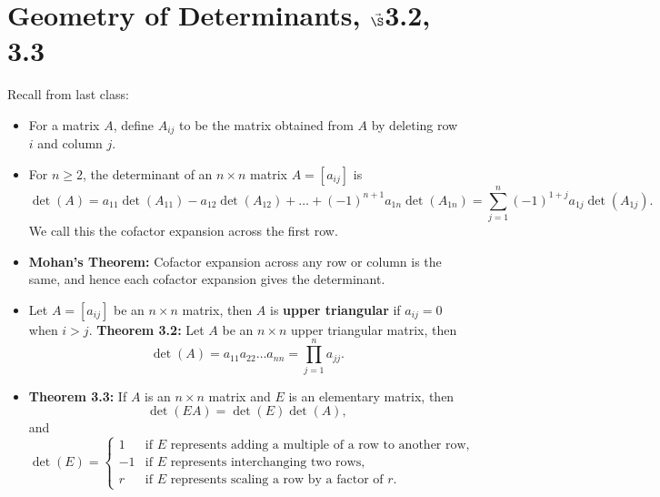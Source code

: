 


%

%

\section{{Geometry of Determinants, $\vec\S$3.2, 3.3}}%
% 

%
\thispagestyle{fancy}

Recall from last class:

\begin{itemize}
\item For a matrix $A$, define  $A_{ij}$ to be the matrix obtained from $A$ by deleting row $i$ and column $j$.
\item For $n\geq 2$, the determinant of an $n\times n$ matrix $A=[a_{ij}]$ is
\begin{equation*}
\operatorname{det}(A)= a_{11} \operatorname{det}(A_{11}) - a_{12} \operatorname{det}(A_{12})+\dots + (-1)^{n+1} a_{1n} \operatorname{det}(A_{1n})=\sum_{j=1}^{n}(-1)^{1+j}a_{1j} \operatorname{det}(A_{1j}).
\end{equation*} We call this the cofactor expansion across the first row.
\item {\bf Mohan's Theorem:} Cofactor expansion across any row or column is the same, and hence each cofactor expansion gives the determinant.
\item Let $A=[a_{ij}]$ be an $n\times n$ matrix, then $A$ is {\bf upper triangular} if $a_{ij}=0$ when $i>j$.
{\bf Theorem 3.2:} Let $A$ be an $n\times n$ upper triangular matrix, then $$\operatorname{det}(A)= a_{11}a_{22}\dots a_{nn} = \prod_{j=1}^n a_{jj}.$$
\item {\bf Theorem 3.3:} If $A$ is an $n\times n$ matrix and $E$ is an elementary matrix, then $$\operatorname{det}(EA)=\operatorname{det}(E) \operatorname{det}(A),$$ and 
$$\operatorname{det}(E)=\begin{cases}
1 & \text{if $E$ represents adding a multiple of a row to another row,}\\
-1 & \text{if $E$ represents interchanging two rows,}\\
r & \text{if $E$ represents scaling a row by a factor of $r$.}
\end{cases}$$
\end{itemize}


